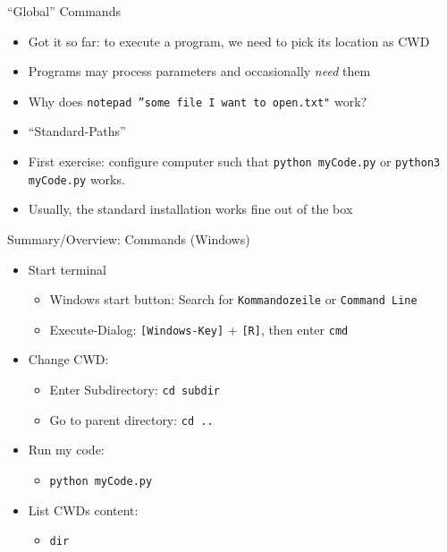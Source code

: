 \begin{frame}{\enquote{Global} Commands}
%
\begin{itemize}
\item Got it so far: to execute a program, we need to pick its location as CWD
\item Programs may process parameters and occasionally \emph{need} them
\item Why does \texttt{notepad ''some file I want to open.txt"} work?
\item[\Thus] \enquote{Standard-Paths}
\item[\Thus] First exercise: configure computer such that \texttt{python myCode.py} or \texttt{python3 myCode.py} works.
\item Usually, the standard installation works fine out of the box
\end{itemize}
%
\end{frame}


\begin{frame}{Summary/Overview: Commands (Windows)}
\begin{itemize}
\item Start terminal
	\begin{itemize}
	\item Windows start button: Search for \texttt{Kommandozeile} or \texttt{Command Line}
	\item Execute-Dialog: \texttt{[Windows-Key]} + \texttt{[R]}, then enter \texttt{cmd}
	\end{itemize}
\item Change CWD:
	\begin{itemize}
	\item Enter Subdirectory: \texttt{cd subdir}
	\item Go to parent directory: \texttt{cd ..}
	\end{itemize}
\item Run my code:
	\begin{itemize}
	\item \texttt{python myCode.py}
	\end{itemize}
\item List CWDs content:
	\begin{itemize}
	\item \texttt{dir}
	\end{itemize}
\end{itemize}
\end{frame}

